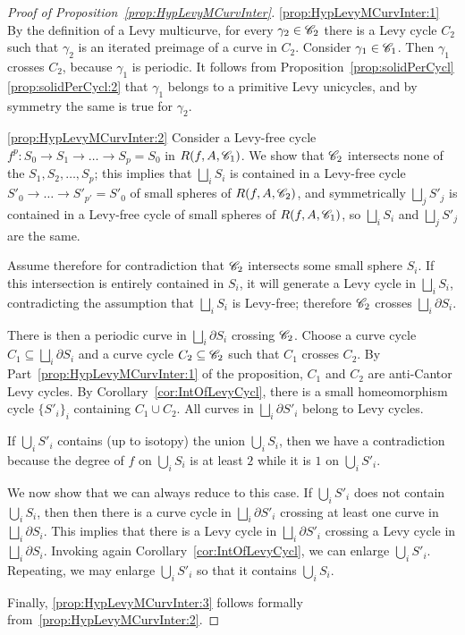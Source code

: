\documentclass{amsart}
\begin{document}
\begin{proof}[Proof of Proposition~\ref{prop:HypLevyMCurvInter}]
  \eqref{prop:HypLevyMCurvInter:1} By the definition of a Levy
  multicurve, for every $\gamma_2\in{\mathscr C}_2$ there is a Levy cycle $C_2$
  such that $\gamma_2$ is an iterated preimage of a curve in
  $C_2$. Consider $\gamma_1\in{\mathscr C}_1$. Then $\gamma_1$ crosses $C_2$,
  because $\gamma_1$ is periodic. It follows from
  Proposition~\ref{prop:solidPerCycl}\eqref{prop:solidPerCycl:2} that
  $\gamma_1$ belongs to a primitive Levy unicycles, and by
  symmetry the same is true for $\gamma_2$.

  \eqref{prop:HypLevyMCurvInter:2} Consider a Levy-free cycle
  $f^p\colon S_0\to S_1\to\dots\to S_p=S_0$ in $R(f,A,{\mathscr C}_1)$. We show
  that ${\mathscr C}_2$ intersects none of the $S_1,S_2,\dots,S_p$; this
  implies that $\bigsqcup_i S_i$ is contained in a Levy-free cycle
  $S'_0\to\dots\to S'_{p'}=S'_0$ of small spheres of $R(f,A,{\mathscr C}_2)$, and
  symmetrically $\bigsqcup_j S'_j$ is contained in a Levy-free cycle of
  small spheres of $R(f,A,{\mathscr C}_1)$, so $\bigsqcup_i S_i$ and
  $\bigsqcup_j S'_j$ are the same.

  Assume therefore for contradiction that ${\mathscr C}_2$ intersects some
  small sphere $S_i$. If this intersection is entirely contained in
  $S_i$, it will generate a Levy cycle in $\bigsqcup_i S_i$,
  contradicting the assumption that $\bigsqcup_i S_i$ is Levy-free;
  therefore ${\mathscr C}_2$ crosses $\bigsqcup_i\partial S_i$.

  There is then a periodic curve in $\bigsqcup_i \partial S_i$
  crossing ${\mathscr C}_2$. Choose a curve cycle
  $C_1\subseteq\bigsqcup_i \partial S_i$ and a curve cycle
  $C_2\subseteq{\mathscr C}_2$ such that $C_1$ crosses $C_2$. By
  Part~\eqref{prop:HypLevyMCurvInter:1} of the proposition, $C_1$ and
  $C_2$ are anti-Cantor Levy cycles. By
  Corollary~\ref{cor:IntOfLevyCycl}, there is a small homeomorphism
  cycle $\{S'_i\}_i$ containing $C_1\cup C_2$. All curves in
  $\bigsqcup_i\partial S'_i$ belong to Levy cycles.

  If $\bigcup_i S'_i$ contains (up to isotopy) the union $\bigcup_i
  S_i$, then we have a contradiction because the degree of $f$ on
  $\bigcup_i S_i$ is at least $2$ while it is $1$ on $\bigcup_i
  S'_i$.

  We now show that we can always reduce to this case.  If
  $\bigcup_i S'_i$ does not contain $\bigcup_i S_i$, then then there
  is a curve cycle in $\bigsqcup_i\partial S'_i$ crossing at least one
  curve in $\bigsqcup_i \partial S_i$.  This implies that there is a
  Levy cycle in $\bigsqcup_i\partial S'_i$ crossing a Levy cycle in
  $\bigsqcup_i \partial S_i$. Invoking again
  Corollary~\ref{cor:IntOfLevyCycl}, we can enlarge $\bigcup_i
  S'_i$. Repeating, we may enlarge $\bigcup_i S'_i$ so that it
  contains $\bigcup_i S_i$.

  Finally, \eqref{prop:HypLevyMCurvInter:3} follows formally
  from~\eqref{prop:HypLevyMCurvInter:2}.
\end{proof}
\end{document}
